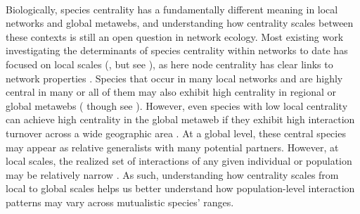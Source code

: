 \documentclass[12pt]{article}
\begin{document}
\paragraph*{}
Biologically, species centrality has a fundamentally different meaning in local networks and global metawebs, and understanding how centrality scales between these contexts is still an open question in network ecology. Most existing work investigating the determinants of species centrality within networks to date has focused on local scales (\citep{maia2019plant}, but see \citep{moulatlet2023species}), as here node centrality has clear links to network properties \citep{gonzalez2010centrality, maia2019plant, cagua2019keystoneness}. Species that occur in many local networks and are highly central in many or all of them may also exhibit high centrality in regional or global metawebs (\citep{estrada2007characterization, martins2025determinants} though see \citep{dallas2022parasite}). However, even species with low local centrality can achieve high centrality in the global metaweb if they exhibit high interaction turnover across a wide geographic area \citep{carstensen2014beta, simanonok2014partitioning}. At a global level, these central species may appear as relative generalists with many potential partners. However, at local scales, the realized set of interactions of any given individual or population may be relatively narrow \citep{bison2015upscaling, arroyo2023intraspecific}. As such, understanding how centrality scales from local to global scales helps us better understand how population-level interaction patterns may vary across mutualistic species' ranges. 




\end{document}
